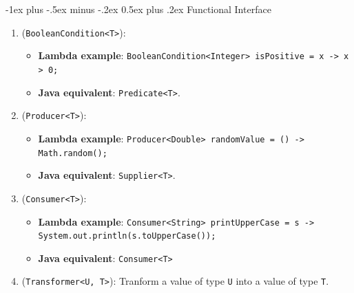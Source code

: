 \documentclass[10pt, landscape]{article}
\makeatletter
\renewcommand{\section}{\@startsection{section}{1}{0mm}%
                                {-1ex plus -.5ex minus -.2ex}%
                                {0.5ex plus .2ex}%
                                {\normalfont\large\bfseries}}
\makeatother
\begin{document}
\raggedright
\footnotesize
\begin{multicols}{4}


\setlength{\columnseprule}{0.25pt}
\setlength{\premulticols}{1pt}
\setlength{\postmulticols}{1pt}
\setlength{\multicolsep}{1pt}
\setlength{\columnsep}{2pt}

\begin{center}
\end{center}
\section{Functional Interface}
\begin{enumerate}
    \item (\texttt{BooleanCondition<T>}):
    \begin{itemize}
        \item \textbf{Lambda example}: \texttt{BooleanCondition<Integer> isPositive = x -> x > 0;}
        \item \textbf{Java equivalent}: \texttt{Predicate<T>}.
    \end{itemize}
    \item (\texttt{Producer<T>}): 
    \begin{itemize}
        \item \textbf{Lambda example}: \texttt{Producer<Double> randomValue = () -> Math.random();}
        \item \textbf{Java equivalent}: \texttt{Supplier<T>}.
    \end{itemize}
    \item (\texttt{Consumer<T>}):
    \begin{itemize}
        \item \textbf{Lambda example}: \texttt{Consumer<String> printUpperCase = s -> System.out.println(s.toUpperCase());}
        \item \textbf{Java equivalent}: \texttt{Consumer<T>}
    \end{itemize}
    \item (\texttt{Transformer<U, T>}): Tranform a value of type \texttt{U} into a value of type \texttt{T}.
    \begin{itemize}

\end{itemize}
\end{enumerate}
\end{multicols}
\end{document}
